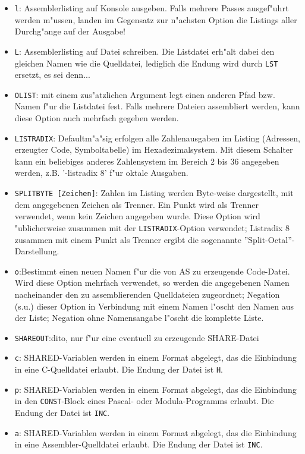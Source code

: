 \documentclass[12pt,a4paper,twoside]{report}
\newcommand{\tty}[1]{{\tt #1}}
\begin{document}
\begin{itemize}
\item{\tty{l}: Assemblerlisting auf Konsole ausgeben.  Falls mehrere
      Passes ausgef"uhrt werden m"ussen, landen im Gegensatz zur
      n"achsten Option die Listings aller Durchg"ange auf der Ausgabe!}
\item{\tty{L}: Assemblerlisting auf Datei schreiben.  Die Listdatei erh"alt
      dabei den gleichen Namen wie die Quelldatei, lediglich die Endung
      wird durch \tty{LST} ersetzt, es sei denn...}
\item{\tty{OLIST}: mit einem zus"atzlichen Argument legt einen anderen
      Pfad bzw. Namen f"ur die Listdatei fest.  Falls mehrere Dateien
      assembliert werden, kann diese Option auch mehrfach gegeben werden.}
\item{\tty{LISTRADIX}: Defaultm"a"sig erfolgen alle Zahlenausgaben im Listing
      (Adressen, erzeugter Code, Symboltabelle) im Hexadezimalsystem.  Mit
      diesem Schalter kann ein beliebiges anderes Zahlensystem im Bereich
      2 bis 36 angegeben werden, z.B. '-listradix 8' f"ur oktale Ausgaben.}
\item{\tty{SPLITBYTE [Zeichen]}: Zahlen im Listing werden Byte-weise
      dargestellt, mit dem angegebenen Zeichen als Trenner.  Ein Punkt wird
      als Trenner verwendet, wenn kein Zeichen angegeben wurde.  Diese Option
      wird "ublicherweise zusammen mit der \tty{LISTRADIX}-Option verwendet;
      Listradix 8 zusammen mit einem Punkt als Trenner ergibt die sogenannte
      ''Split-Octal''-Darstellung.}
\item{\tty{o}:Bestimmt einen neuen Namen f"ur die von AS zu erzeugende
      Code-Datei.  Wird diese Option mehrfach verwendet, so werden
      die angegebenen Namen nacheinander den zu assemblierenden
      Quelldateien zugeordnet; Negation (s.u.) dieser Option in
      Verbindung mit einem Namen l"oscht den Namen aus der Liste;
      Negation ohne Namensangabe l"oscht die komplette Liste.}
\item{\tty{SHAREOUT}:dito, nur f"ur eine eventuell zu erzeugende
      SHARE-Datei}
\item{\tty{c}: SHARED-Variablen werden in einem Format abgelegt, das die
      Einbindung in eine C-Quelldatei erlaubt.  Die Endung der Datei
      ist \tty{H}.}
\item{\tty{p}: SHARED-Variablen werden in einem Format abgelegt, das die
      Einbindung in den \tty{CONST}-Block eines Pascal- oder Modula-Programms
      erlaubt.  Die Endung der Datei ist \tty{INC}.}
\item{\tty{a}: SHARED-Variablen werden in einem Format abgelegt, das die
      Einbindung in eine Assembler-Quelldatei erlaubt.  Die Endung
      der Datei ist \tty{INC}.}
\end{itemize}
\end{document}
